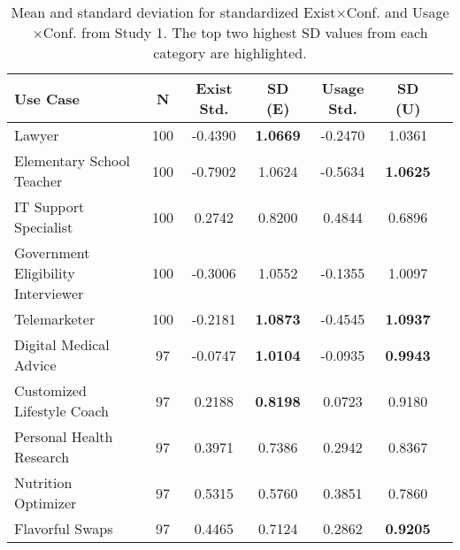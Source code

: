 \begin{table}[h]
\begin{center}
\small
\begin{tabular}{lcccccc}
\toprule
\textbf{Use Case} & \textbf{N} & \textbf{Exist Std.} & \textbf{SD (E)} & \textbf{Usage Std.} & \textbf{SD (U)} \\
\midrule
Lawyer & 100 & -0.4390 & \textbf{1.0669} & -0.2470 & 1.0361 \\
Elementary School Teacher & 100 & -0.7902 & 1.0624 & -0.5634 & \textbf{1.0625} \\
IT Support Specialist & 100 & 0.2742 & 0.8200 & 0.4844 & 0.6896 \\
Government Eligibility Interviewer & 100 & -0.3006 & 1.0552 & -0.1355 & 1.0097 \\
Telemarketer & 100 & -0.2181 & \textbf{1.0873} & -0.4545 & \textbf{1.0937} \\
\hline
Digital Medical Advice & 97 & -0.0747 & \textbf{1.0104} & -0.0935 & \textbf{0.9943} \\
Customized Lifestyle Coach & 97 & 0.2188 & \textbf{0.8198} & 0.0723 & 0.9180 \\
Personal Health Research & 97 & 0.3971 & 0.7386 & 0.2942 & 0.8367 \\
Nutrition Optimizer & 97 & 0.5315 & 0.5760 & 0.3851 & 0.7860 \\
Flavorful Swaps & 97 & 0.4465 & 0.7124 & 0.2862 & \textbf{0.9205} \\
\bottomrule
\end{tabular}
\caption{Mean and standard deviation for standardized Exist$\times$Conf. and Usage$\times$Conf. from Study 1. The top two highest SD values from each category are highlighted.}
\end{center}
\label{tab:use-case-effects-sd}
\end{table}
